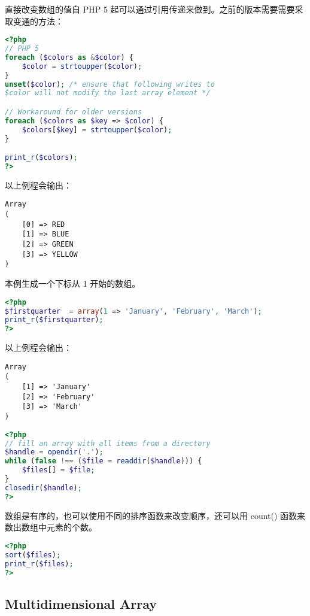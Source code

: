 直接改变数组的值自 PHP 5 起可以通过引用传递来做到。之前的版本需要需要采取变通的方法：





\begin{lstlisting}[language=PHP]
<?php
// PHP 5
foreach ($colors as &$color) {
    $color = strtoupper($color);
}
unset($color); /* ensure that following writes to
$color will not modify the last array element */

// Workaround for older versions
foreach ($colors as $key => $color) {
    $colors[$key] = strtoupper($color);
}

print_r($colors);
?>
\end{lstlisting}

以上例程会输出：


\begin{verbatim}
Array
(
    [0] => RED
    [1] => BLUE
    [2] => GREEN
    [3] => YELLOW
)
\end{verbatim}


本例生成一个下标从 1 开始的数组。

\begin{lstlisting}[language=PHP]
<?php
$firstquarter  = array(1 => 'January', 'February', 'March');
print_r($firstquarter);
?>
\end{lstlisting}

以上例程会输出：


\begin{verbatim}
Array 
(
    [1] => 'January'
    [2] => 'February'
    [3] => 'March'
)
\end{verbatim}




\begin{lstlisting}[language=PHP]
<?php
// fill an array with all items from a directory
$handle = opendir('.');
while (false !== ($file = readdir($handle))) {
    $files[] = $file;
}
closedir($handle); 
?>
\end{lstlisting}

数组是有序的，也可以使用不同的排序函数来改变顺序，还可以用 count() 函数来数出数组中元素的个数。

\begin{lstlisting}[language=PHP]
<?php
sort($files);
print_r($files);
?>
\end{lstlisting}

\subsection{Multidimensional Array}


